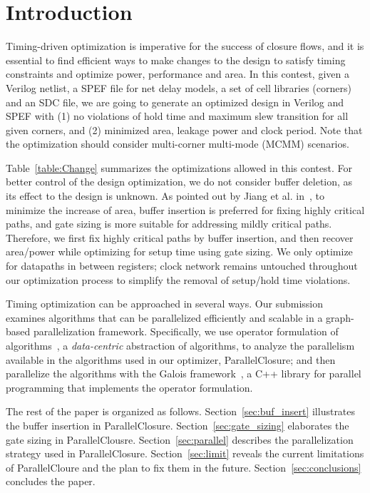 \section{Introduction}
Timing-driven optimization is imperative for the success of closure flows, and it is essential to find efficient ways to make changes to the design to satisfy timing constraints and optimize power, performance and area. In this contest, given a Verilog netlist, a SPEF file for net delay models, a set of cell libraries (corners) and an SDC file, we are going to generate an optimized design in Verilog and SPEF with (1) no violations of hold time and maximum slew transition for all given corners, and (2) minimized area, leakage power and clock period. Note that the optimization should consider multi-corner multi-mode (MCMM) scenarios.

Table~\ref{table:Change} summarizes the optimizations allowed in this contest. For better control of the design optimization, we do not consider buffer deletion, as its effect to the design is unknown. As pointed out by Jiang et al. in~\cite{Jiang:Interleaving}, to minimize the increase of area, buffer insertion is preferred for fixing highly critical paths, and gate sizing is more suitable for addressing mildly critical paths. Therefore, we first fix highly critical paths by buffer insertion, and then recover area/power while optimizing for setup time using gate sizing. We only optimize for datapaths in between registers; clock network remains untouched throughout our optimization process to simplify the removal of setup/hold time violations.

Timing optimization can be approached in several ways. Our submission examines algorithms that can be parallelized efficiently and scalable in a graph-based parallelization framework. Specifically, we use operator formulation of algorithms~\cite{pingali11}, a {\em data-centric} abstraction of algorithms, to analyze the parallelism available in the algorithms used in our optimizer, ParallelClosure; and then parallelize the algorithms with the Galois framework~\cite{nguyen:2013,Lenharth:2016}, a C++ library for parallel programming that implements the operator formulation.

The rest of the paper is organized as follows. Section~\ref{sec:buf_insert} illustrates the buffer insertion in ParallelClosure. Section~\ref{sec:gate_sizing} elaborates the gate sizing in ParallelClousre. Section~\ref{sec:parallel} describes the parallelization strategy used in ParallelClosure. Section~\ref{sec:limit} reveals the current limitations of ParallelCloure and the plan to fix them in the future. Section~\ref{sec:conclusions} concludes the paper.

